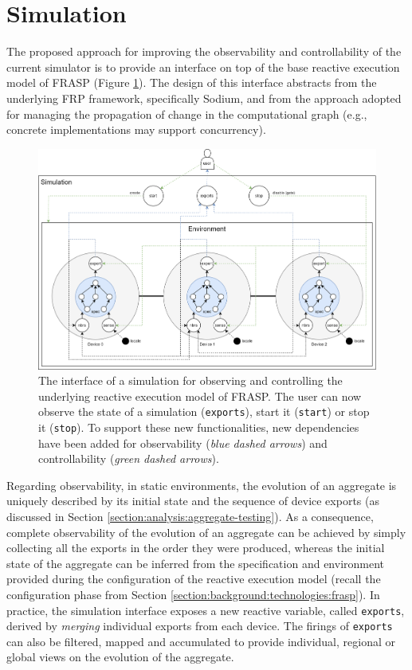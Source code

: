 
\section{Simulation}
\label{section:design:simulation}

The proposed approach for improving the observability and controllability of
the current simulator is to provide an interface on top of the base reactive
execution model of FRASP (Figure \ref{figure:simulation}). The design of this
interface abstracts from the underlying \ac{FRP} framework, specifically
Sodium, and from the approach adopted for managing the propagation of change in
the computational graph (e.g., concrete implementations may support
concurrency).

\begin{figure}[!ht]
  \centering
  \includegraphics[width=1\textwidth]{resources/figures/simulation.png}
  \caption{
    The interface of a simulation for observing and controlling the
    underlying reactive execution model of FRASP. The user can now observe the
    state of a simulation (\texttt{exports}), start it (\texttt{start}) or stop
    it (\texttt{stop}). To support these new functionalities, new
    dependencies have been added for observability (\textit{blue dashed arrows})
    and controllability (\textit{green dashed arrows}).
  }
  \label{figure:simulation}
\end{figure}

Regarding observability, in static environments, the evolution of an aggregate
is uniquely described by its initial state and the sequence of device exports
(as discussed in Section \ref{section:analysis:aggregate-testing}). As a
consequence, complete observability of the evolution of an aggregate can be
achieved by simply collecting all the exports in the order they were produced,
whereas the initial state of the aggregate can be inferred from the
specification and environment provided during the configuration of the reactive
execution model (recall the configuration phase from Section
\ref{section:background:technologies:frasp}). In practice, the simulation
interface exposes a new reactive variable, called \texttt{exports}, derived by
\textit{merging} individual exports from each device. The firings of
\texttt{exports} can also be filtered, mapped and accumulated to provide
individual, regional or global views on the evolution of the aggregate.

